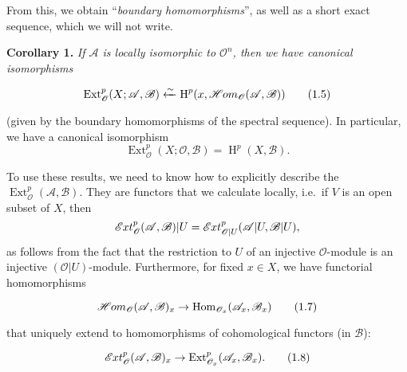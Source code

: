 \documentclass{article}
\newenvironment{itenv}[1]
  {\phantomsection\par\smallskip\noindent\textbf{#1.}\itshape}
  {\par\smallskip}
\newenvironment{eqenv}
  {}
  {}
\theoremstyle{definition}
\theoremstyle{definition}
\theoremstyle{definition}
\theoremstyle{definition}
\theoremstyle{remark}
\begin{document}
From this, we obtain ``\emph{boundary homomorphisms}'', as well as a short exact sequence, which we will not write.

\leavevmode{}%
\begin{itenv}{Corollary 1}
If \({\mathscr{A}}\) is locally isomorphic to \({\mathscr{O}}^n\), then we have canonical isomorphisms

\leavevmode{}%
\begin{eqenv}
\[
  \operatorname{Ext}_{\mathscr{O}}^p(X;{\mathscr{A}},{\mathscr{B}}) \xleftarrow{\sim} \operatorname{H}^p(x,\mathscr{H}\kern -.5pt om_{\mathscr{O}}({\mathscr{A}},{\mathscr{B}}))
\tag{1.5}
\]

\end{eqenv}

(given by the boundary homomorphisms of the spectral sequence).
In particular, we have a canonical isomorphism
\[
  \operatorname{Ext}_{\mathscr{O}}^p(X;{\mathscr{O}},{\mathscr{B}}) = \operatorname{H}^p(X,{\mathscr{B}}).
\tag{1.6}
\]

\end{itenv}

To use these results, we need to know how to explicitly describe the \(\operatorname{Ext}_{\mathscr{O}}^p({\mathscr{A}},{\mathscr{B}})\).
They are functors that we calculate locally, i.e.~if \(V\) is an open subset of \(X\), then
\[
  \mathscr{E}\kern -.5pt xt_{\mathscr{O}}^p({\mathscr{A}},{\mathscr{B}})|U = \mathscr{E}\kern -.5pt xt_{{\mathscr{O}}|U}^p({\mathscr{A}}|U,{\mathscr{B}}|U),
\]
as follows from the fact that the restriction to \(U\) of an injective \({\mathscr{O}}\)-module is an injective \(({\mathscr{O}}|U)\)-module.
Furthermore, for fixed \(x\in X\), we have functorial homomorphisms

\leavevmode{}%
\begin{eqenv}
\[
  \mathscr{H}\kern -.5pt om_{\mathscr{O}}({\mathscr{A}},{\mathscr{B}})_x \to \operatorname{Hom}_{{\mathscr{O}}_x}({\mathscr{A}}_x,{\mathscr{B}}_x)
\tag{1.7}
\]

\end{eqenv}

that uniquely extend to homomorphisms of cohomological functors (in \({\mathscr{B}}\)):

\leavevmode{}%
\begin{eqenv}
\[
  \mathscr{E}\kern -.5pt xt_{\mathscr{O}}^p({\mathscr{A}},{\mathscr{B}})_x \to \operatorname{Ext}_{{\mathscr{O}}_x}^p({\mathscr{A}}_x,{\mathscr{B}}_x).
\tag{1.8}
\]

\end{eqenv}
\end{document}
